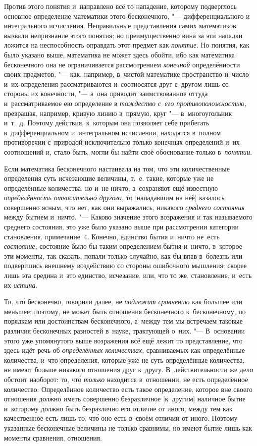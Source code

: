 Против этого понятия и~направлено всё то нападение, которому подверглось
основное определение математики этого бесконечного, "--- дифференциального и
интегрального исчисления. Неправильные представления самих математиков вызвали
непризнание этого понятия; но преимущественно вина за эти нападки ложится на
неспособность оправдать этот предмет как {\em понятие}. Но понятия, как было
указано выше, математика не может здесь обойти, ибо как математика бесконечного
она не ограничивается рассмотрением {\em конечной} определённости своих
предметов, "--- как, например, в~чистой математике пространство и~число и~их
определения рассматриваются и~соотносятся друг с~другом лишь со стороны их
конечности, "--- а~она приводит заимствованное оттуда и~рассматриваемое ею
определение в {\em тождество с~его противоположностью,} превращая, например,
кривую линию в~прямую, круг "--- в~многоугольник и~т.~д. Поэтому действия, к~которым
она позволяет себе прибегать в~дифференциальном и~интегральном исчислении,
находятся в~полном противоречии с~природой исключительно только конечных
определений и~их соотношений и, стало быть, могли бы найти своё обоснование
только в~{\em понятии}.

Если математика бесконечного настаивала на том, что эти количественные
определения суть исчезающие величины, т.~е. такие, которые уже
не определённые количества, но и~не ничто, а~сохраняют ещё
известную {\em определённость относительно другого,} то
[нападавшим на неё] казалось совершенно ясным, что нет,
как они выражались, никакого {\em среднего состояния} между
бытием и~ничто. "--- Каково значение этого возражения
и так называемого среднего состояния, это уже было указано
выше при рассмотрении категории становления, примечание~4. Конечно,
единство бытия и~ничто не~есть {\em состояние;} состояние было бы
таким определением бытия и~ничто, в~которое эти моменты, так сказать, попали
только случайно, как бы впав в~болезнь или подвергшись внешнему воздействию
со стороны ошибочного мышления; скорее лишь эта средина и~это единство,
исчезание, или, что то же, становление, и~есть их {\em истина}.

То, чт\'{о} бесконечно, говорили далее, не {\em подлежит сравнению} как большее или
меньшее; поэтому, не может быть отношения бесконечного к~бесконечному, по
порядкам или достоинствам бесконечного, а~между тем мы встречаем таковые
различия бесконечных разностей в~науке, трактующей о~них. "--- В~основании
этого уже упомянутого выше возражения всё ещё лежит то представление, что здесь
идёт речь об {\em определённых количествах,} сравниваемых как определённые
количества, и~что определения, которые уже не суть определённые количества, не
имеют больше никакого отношения друг к~другу. В~действительности же дело
обстоит наоборот: то, чт\'{о} {\em только} находится в~отношении, не есть
определённое количество. Определённое количество есть такое определение,
которое вне своего отношения должно иметь совершенно безразличное [к~другим]
наличное бытие и~которому должно быть безразлично его отличие от
иного, между тем как качественное есть лишь то, чт\'{о} оно
есть в~своём отличии от иного. Поэтому указанные бесконечные величины не
только сравнимы, но имеют бытие лишь как моменты сравнения, отношения.

